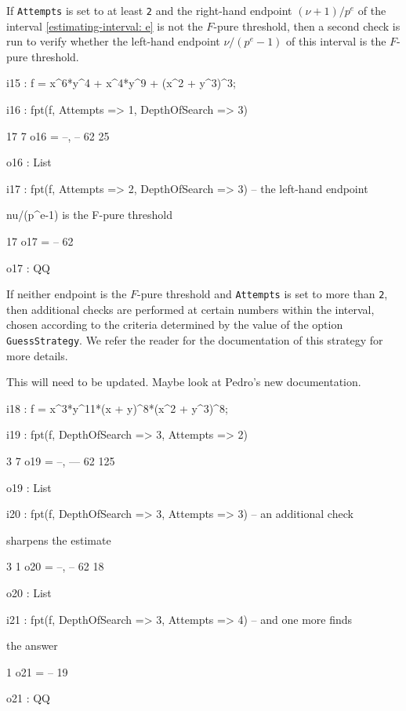\documentclass{amsart}
\begin{document}
If  {\tt Attempts} is set to at least {\tt 2} and the right-hand endpoint $(\nu+1)/p^e$ of the interval \eqref{estimating-interval: e} is not the $F$-pure threshold, then a second check is run to verify whether the left-hand endpoint $\nu/(p^e-1)$ of this interval is the $F$-pure threshold.

{\small
{}
\begin{MyVerbatim}

i15 : f = x^6*y^4 + x^4*y^9 + (x^2 + y^3)^3;

i16 : fpt(f, Attempts => 1, DepthOfSearch => 3)

       17   7
o16 = {--, --}
       62  25

o16 : List

i17 : fpt(f, Attempts => 2, DepthOfSearch => 3) -- the left-hand endpoint

      nu/(p^e-1) is the F-pure threshold

      17
o17 = --
      62

o17 : QQ

\end{MyVerbatim}
}

If neither endpoint is the $F$-pure threshold and {\tt Attempts} is set to more than {\tt 2}, then  additional checks are performed at certain numbers within the interval, chosen according to the criteria determined by the value of the option {\tt GuessStrategy}.  We refer the reader for the documentation of this strategy for more details.

{\color{red}  This will need to be updated.  Maybe look at Pedro's new documentation.}            
            
{\small
{}
\begin{MyVerbatim}

i18 : f = x^3*y^11*(x + y)^8*(x^2 + y^3)^8;

i19 : fpt(f, DepthOfSearch => 3, Attempts => 2)

        3   7
o19 = {--, ---}
       62  125

o19 : List

i20 : fpt(f, DepthOfSearch => 3, Attempts => 3) -- an additional check

      sharpens the estimate

        3   1
o20 = {--, --}
       62  18

o20 : List

i21 : fpt(f, DepthOfSearch => 3, Attempts => 4) -- and one more finds

      the answer

       1
o21 = --
      19

o21 : QQ
\end{MyVerbatim}
}
\medspace
\end{document}
